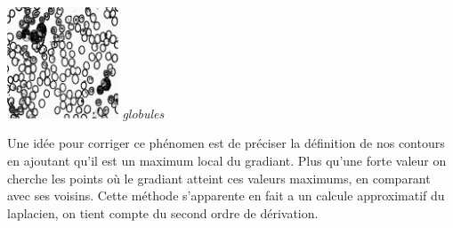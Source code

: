 \documentclass[a4,12pt]{article}
\begin{document}
\begin{minipage}[c]{0.20\linewidth}
	\begin{center}
		\includegraphics[width = 33mm]{./img/p2test_grad_mean_globules.jpg}
		\textit{globules}
	\end{center}
\end{minipage}

Une idée pour corriger ce phénomen est de préciser la définition de nos contours en ajoutant qu'il est un maximum local du gradiant.
Plus qu'une forte valeur on cherche les points où le gradiant atteint ces valeurs maximums, en comparant avec ses voisins. 
Cette méthode s'apparente en fait a un calcule approximatif du laplacien, on tient compte du second ordre de dérivation.\\
\end{document}
